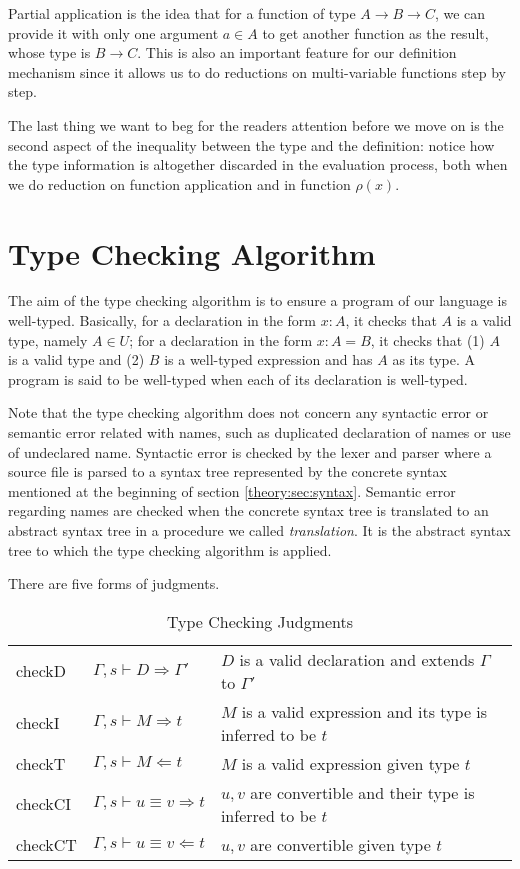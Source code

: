 Partial application is the idea that for a function of type $A \to B \to C$, we can provide it with only one argument $a \in A$ to get another function as the result, whose type is $B \to C$. This is also an important feature for our definition mechanism since it allows us to do reductions on multi-variable functions step by step.

The last thing we want to beg for the readers attention before we move on is the second aspect of the inequality between the type and the definition: notice how the type information is altogether discarded in the evaluation process, both when we do reduction on function application and in function $\rho(x)$.

\section{Type Checking Algorithm}\label{theory:sec:check}
The aim of the type checking algorithm is to ensure a program of our language is well-typed. Basically, for a declaration in the form $x : A$, it checks that $A$ is a valid type, namely $A \in U$; for a declaration in the form $x : A = B$, it checks that (1) $A$ is a valid type and (2) $B$ is a well-typed expression and has $A$ as its type. A program is said to be well-typed when each of its declaration is well-typed.

Note that the type checking algorithm does not concern any syntactic error or semantic error related with names, such as duplicated declaration of names or use of undeclared name. Syntactic error is checked by the lexer and parser where a source file is parsed to a syntax tree represented by the concrete syntax mentioned at the beginning of section \ref{theory:sec:syntax}. Semantic error regarding names are checked when the concrete syntax tree is translated to an abstract syntax tree in a procedure we called \emph{translation}. It is the abstract syntax tree to which the type checking algorithm is applied.

There are five forms of judgments.
\begin{table}[h]
  \centering
  \begin{tabular}{l l l}
    checkD   & $\Gamma,s \vdash D \Rightarrow \Gamma'$ & $D$ is a valid declaration and extends $\Gamma$ to $\Gamma'$ \\
    checkI & $\Gamma,s \vdash M \Rightarrow t$ & $M$ is a valid expression and its type is inferred to be $t$ \\
    checkT  & $\Gamma,s \vdash M \Leftarrow t$ & $M$ is a valid expression given type $t$ \\
    checkCI & $\Gamma,s \vdash u \equiv v \Rightarrow t $ & $u, v$ are convertible and their type is inferred to be $t$ \\ 
    checkCT  & $\Gamma,s \vdash u \equiv v \Leftarrow t  $ & $u, v$ are convertible given type $t$
  \end{tabular}
  \caption{Type Checking Judgments}
  \label{theory:tab:judgments}
\end{table}

